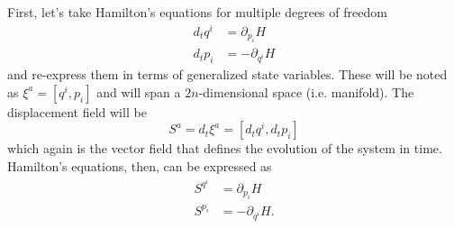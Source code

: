 First, let's take Hamilton's equations for multiple degrees of freedom
\begin{equation}\label{rp-cm-hmd-condEquations}
	\tag{HM-1M}
	\begin{aligned}
		d_t q^i &= \partial_{p_i} H \\
		d_t p_i &= - \partial_{q^i} H
	\end{aligned}
\end{equation}
and re-express them in terms of generalized state variables. These will be noted as $\xi^a = [q^i, p_i]$ and will span a $2n$-dimensional space (i.e. manifold). The displacement field will be
\begin{equation}\label{rp-cm-displacementNd}
	S^a = d_t \xi^a = [d_t q^i, d_t p_i]
\end{equation}
which again is the vector field that defines the evolution of the system in time. Hamilton's equations, then, can be expressed as
\begin{equation}
	\begin{aligned}
		S^{q^i} &= \partial_{p_i} H \\
		S^{p_i} &= - \partial_{q^i} H.
	\end{aligned}
\end{equation}

